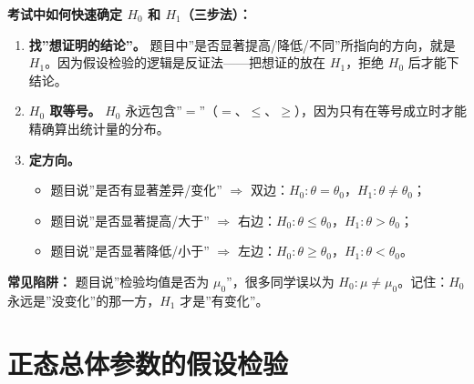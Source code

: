 \documentclass[lang=cn,11pt]{elegantbook}
\begin{document}
\begin{note}
\textbf{考试中如何快速确定 $H_0$ 和 $H_1$（三步法）：}
\begin{enumerate}
    \item \textbf{找”想证明的结论”。} 题目中”是否显著提高/降低/不同”所指向的方向，就是 $H_1$。因为假设检验的逻辑是反证法——把想证的放在 $H_1$，拒绝 $H_0$ 后才能下结论。
    \item \textbf{$H_0$ 取等号。} $H_0$ 永远包含”$=$”（$=$、$\le$、$\ge$），因为只有在等号成立时才能精确算出统计量的分布。
    \item \textbf{定方向。}
    \begin{itemize}
        \item 题目说”是否有显著差异/变化” $\Longrightarrow$ 双边：$H_0\colon\theta=\theta_0$，$H_1\colon\theta\neq\theta_0$；
        \item 题目说”是否显著提高/大于” $\Longrightarrow$ 右边：$H_0\colon\theta\le\theta_0$，$H_1\colon\theta>\theta_0$；
        \item 题目说”是否显著降低/小于” $\Longrightarrow$ 左边：$H_0\colon\theta\ge\theta_0$，$H_1\colon\theta<\theta_0$。
    \end{itemize}
\end{enumerate}
\textbf{常见陷阱：} 题目说”检验均值是否为 $\mu_0$”，很多同学误以为 $H_0\colon\mu\neq\mu_0$。记住：$H_0$ 永远是”没变化”的那一方，$H_1$ 才是”有变化”。
\end{note}


\section{正态总体参数的假设检验} \label{sec:ht-normal}
\end{document}
